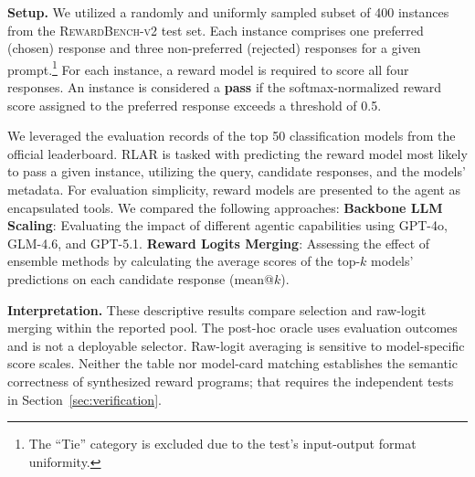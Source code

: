 \noindent\textbf{Setup.} We utilized a randomly and uniformly sampled subset of 400 instances from the \textsc{RewardBench-v2} test set. Each instance comprises one preferred (chosen) response and three non-preferred (rejected) responses for a given prompt.\footnote{The ``Tie'' category is excluded due to the test's input-output format uniformity.} For each instance, a reward model is required to score all four responses. An instance is considered a \textbf{pass} if the softmax-normalized reward score assigned to the preferred response exceeds a threshold of 0.5.

We leveraged the evaluation records of the top 50 classification models from the official leaderboard. RLAR is tasked with predicting the reward model most likely to pass a given instance, utilizing the query, candidate responses, and the models' metadata. For evaluation simplicity, reward models are presented to the agent as encapsulated tools. We compared the following approaches: \textbf{Backbone LLM Scaling}: Evaluating the impact of different agentic capabilities using GPT-4o, GLM-4.6, and GPT-5.1. \textbf{Reward Logits Merging}: Assessing the effect of ensemble methods by calculating the average scores of the top-$k$ models' predictions on each candidate response (mean@$k$).




\noindent\textbf{Interpretation.} These descriptive results compare selection and raw-logit merging within the reported pool. The post-hoc oracle uses evaluation outcomes and is not a deployable selector. Raw-logit averaging is sensitive to model-specific score scales. Neither the table nor model-card matching establishes the semantic correctness of synthesized reward programs; that requires the independent tests in Section~\ref{sec:verification}.
